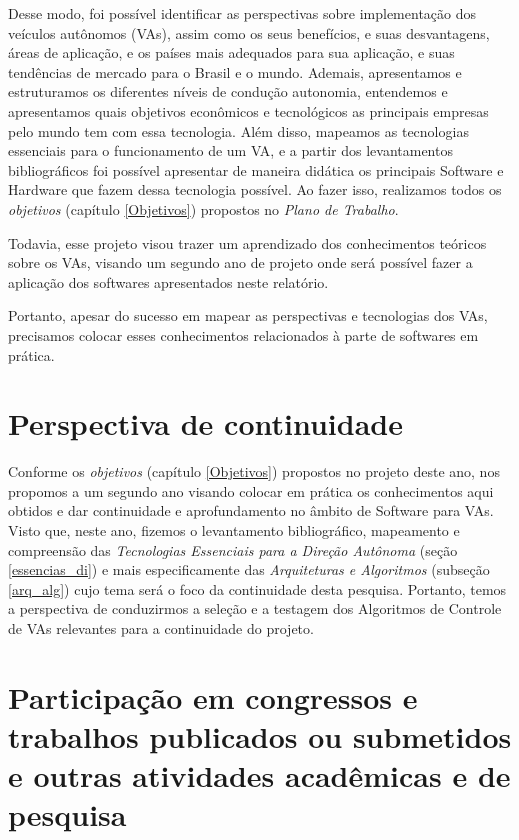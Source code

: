 Desse modo, foi possível identificar as perspectivas sobre implementação dos veículos autônomos (VAs), assim como os seus benefícios, e suas desvantagens, áreas de aplicação, e os países mais adequados para sua aplicação, e suas tendências de mercado para o Brasil e o mundo.
Ademais, apresentamos e estruturamos os diferentes níveis de condução autonomia, entendemos e apresentamos quais objetivos econômicos e tecnológicos as principais empresas pelo mundo tem com essa tecnologia.
Além disso, mapeamos as tecnologias essenciais para o funcionamento de um VA, e a partir dos levantamentos bibliográficos foi possível apresentar de maneira didática os principais Software e Hardware que fazem dessa tecnologia possível.
Ao fazer isso, realizamos todos os \textit{objetivos} (capítulo \ref{Objetivos}) propostos no \textit{Plano de Trabalho}.

Todavia, esse projeto visou trazer um aprendizado dos conhecimentos teóricos sobre os VAs, visando um segundo ano de projeto onde será possível fazer a aplicação dos softwares apresentados neste relatório.

Portanto, apesar do sucesso em mapear as perspectivas e tecnologias dos VAs, precisamos colocar esses conhecimentos relacionados à parte de softwares em prática.

\chapter{Perspectiva de continuidade} \label{continuidade}

Conforme os \textit{objetivos} (capítulo \ref{Objetivos}) propostos no projeto deste ano, nos propomos a um segundo ano visando colocar em prática os conhecimentos aqui obtidos e dar continuidade e aprofundamento no âmbito de Software para VAs. Visto que, neste ano, fizemos o levantamento bibliográfico, mapeamento e compreensão das \textit{Tecnologias Essenciais para a Direção Autônoma} (seção \ref{essencias_di}) e mais especificamente das \textit{Arquiteturas e Algoritmos} (subseção \ref{arq_alg}) cujo tema será o foco da continuidade desta pesquisa. Portanto, temos a perspectiva de conduzirmos a seleção e a testagem dos Algoritmos de Controle de VAs relevantes para a continuidade do projeto.

\chapter{Participação em congressos e trabalhos publicados ou submetidos e outras
atividades acadêmicas e de pesquisa} \label{eventos}

